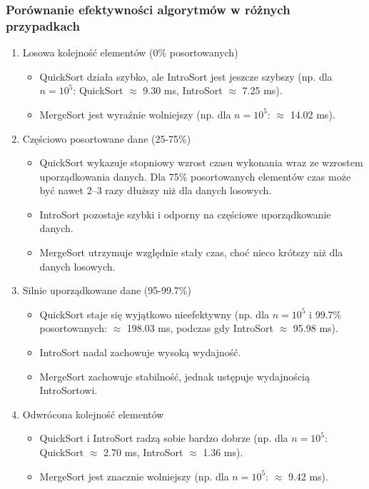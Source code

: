 \documentclass[polish,a4paper]{article}
\begin{document}
\subsubsection{Porównanie efektywności algorytmów w różnych przypadkach}
\begin{enumerate}
    \item{Losowa kolejność elementów (0\% posortowanych)}
    \begin{itemize}
        \item{QuickSort działa szybko, ale IntroSort jest jeszcze szybszy (np. dla $n=10^5$: QuickSort $\approx$ 9.30 ms, IntroSort $\approx$ 7.25 ms).}
        \item{MergeSort jest wyraźnie wolniejszy (np. dla $n=10^5$: $\approx$ 14.02 ms).}
    \end{itemize}
    
    \item{Częściowo posortowane dane (25-75\%)}
    \begin{itemize}
        \item{QuickSort wykazuje stopniowy wzrost czasu wykonania wraz ze wzrostem uporządkowania danych. Dla 75\% posortowanych elementów czas może być nawet 2–3 razy dłuższy niż dla danych losowych.}
        \item{IntroSort pozostaje szybki i odporny na częściowe uporządkowanie danych.}
        \item{MergeSort utrzymuje względnie stały czas, choć nieco krótszy niż dla danych losowych.}
    \end{itemize}
    
    \item{Silnie uporządkowane dane (95-99.7\%)}
    \begin{itemize}
        \item{QuickSort staje się wyjątkowo nieefektywny (np. dla $n=10^5$ i 99.7\% posortowanych: $\approx$ 198.03 ms, podczas gdy IntroSort $\approx$ 95.98 ms).}
        \item{IntroSort nadal zachowuje wysoką wydajność.}
        \item{MergeSort zachowuje stabilność, jednak ustępuje wydajnością IntroSortowi.}
    \end{itemize}
    
    \item{Odwrócona kolejność elementów}
    \begin{itemize}
        \item{QuickSort i IntroSort radzą sobie bardzo dobrze (np. dla $n=10^5$: QuickSort $\approx$ 2.70 ms, IntroSort $\approx$ 1.36 ms).}
        \item{MergeSort jest znacznie wolniejszy (np. dla $n=10^5$: $\approx$ 9.42 ms).}
    \end{itemize}
\end{enumerate}
\end{document}
